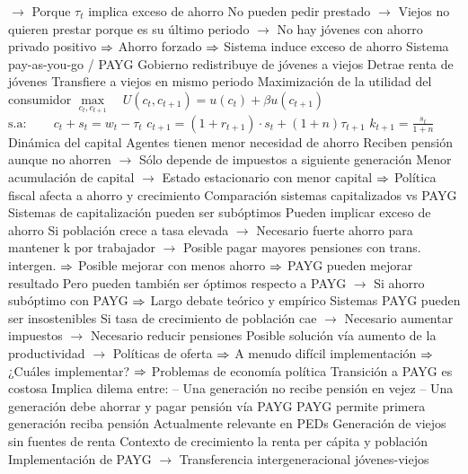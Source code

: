 \documentclass{nuevotema}
\begin{document}
\begin{esquemal}
				\4[] $\to$ Porque $\tau_t$ implica exceso de ahorro
				\4[] No pueden pedir prestado
				\4[] $\to$ Viejos no quieren prestar porque es su último periodo
				\4[] $\to$ No hay jóvenes con ahorro privado positivo
				\4[] $\Rightarrow$ Ahorro forzado
				\4[] $\Rightarrow$ Sistema induce exceso de ahorro
			\3 Sistema pay-as-you-go / PAYG
				\4 Gobierno redistribuye de jóvenes a viejos
				\4[] Detrae renta de jóvenes
				\4[] Transfiere a viejos en mismo periodo
				\4 Maximización de la utilidad del consumidor
				\4[] $\underset{c_{t}, c_{t+1}}{\max} \quad U(c_{t}, c_{t+1}) = u(c_{t})+\beta u(c_{t+1})$
				\4[] \quad $\text{s.a}: \quad \quad c_{t} + s_t = w_t-\tau_t$
				\4[] \quad \quad \quad \quad \quad $c_{t+1}=(1+r_{t+1}) \cdot s_t+(1+n) \tau_{t+1}$
				\4[] \quad \quad \quad \quad \quad $k_{t+1} = \frac{s_t}{1+n}$
				\4 Dinámica del capital
				\4[] Agentes tienen menor necesidad de ahorro
				\4[] Reciben pensión aunque no ahorren
				\4[] $\to$ Sólo depende de impuestos a siguiente generación
				\4[] Menor acumulación de capital
				\4[] $\to$ Estado estacionario con menor capital
				\4[] $\Rightarrow$ Política fiscal afecta a ahorro y crecimiento
			\3 Comparación sistemas capitalizados vs PAYG
				\4 Sistemas de capitalización pueden ser subóptimos
				\4[] Pueden implicar exceso de ahorro
				\4[] Si población crece a tasa elevada
				\4[] $\to$ Necesario fuerte ahorro para mantener k por trabajador
				\4[] $\to$ Posible pagar mayores pensiones con trans. intergen.
				\4[] $\Rightarrow$ Posible mejorar con menos ahorro
				\4[] $\Rightarrow$ PAYG pueden mejorar resultado
				\4[] Pero pueden también ser óptimos respecto a PAYG
				\4[] $\to$ Si ahorro subóptimo con PAYG
				\4[] $\Rightarrow$ Largo debate teórico y empírico
				\4 Sistemas PAYG pueden ser insostenibles
				\4[] Si tasa de crecimiento de población cae
				\4[] $\to$ Necesario aumentar impuestos
				\4[] $\to$ Necesario reducir pensiones
				\4[] Posible solución vía aumento de la productividad
				\4[] $\to$ Políticas de oferta
				\4[] $\Rightarrow$ A menudo difícil implementación
				\4[] $\Rightarrow$ ¿Cuáles implementar?
				\4[] $\Rightarrow$ Problemas de economía política
				\4 Transición a PAYG es costosa
				\4[] Implica dilema entre:
				\4[] -- Una generación no recibe pensión en vejez
				\4[] -- Una generación debe ahorrar y pagar pensión vía PAYG
				\4 PAYG permite primera generación reciba pensión
				\4[] Actualmente relevante en PEDs
				\4[] Generación de viejos sin fuentes de renta
				\4[] Contexto de crecimiento la renta per cápita y población
				\4[] Implementación de PAYG
				\4[] $\to$ Transferencia intergeneracional jóvenes-viejos

\end{esquemal}
\end{document}
